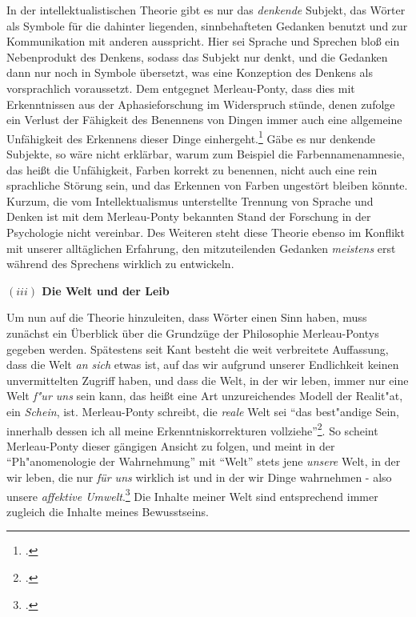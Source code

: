 \documentclass[a4paper, 12pt]{article}
\begin{document}
\begin{onehalfspace}
In der intellektualistischen Theorie gibt es nur das \emph{denkende} Subjekt, das Wörter als Symbole für die dahinter liegenden, sinnbehafteten Gedanken benutzt und zur Kommunikation mit anderen ausspricht. Hier sei Sprache und Sprechen bloß ein Nebenprodukt des Denkens, sodass das Subjekt nur denkt, und die Gedanken dann nur noch in Symbole übersetzt, was eine Konzeption des Denkens als vorsprachlich voraussetzt. Dem entgegnet Merleau-Ponty, dass dies mit Erkenntnissen aus der Aphasieforschung im Widerspruch stünde, denen zufolge ein Verlust der Fähigkeit des Benennens von Dingen immer auch eine allgemeine Unfähigkeit des Erkennens dieser Dinge einhergeht.\footnote{\Cite[Vgl.][S. 208 f.]{merleau1966phanomenologie}.} Gäbe es nur denkende Subjekte, so wäre nicht erklärbar, warum zum Beispiel die Farbennamenamnesie, das heißt die Unfähigkeit, Farben korrekt zu benennen, nicht auch eine rein sprachliche Störung sein, und das Erkennen von Farben ungestört bleiben könnte. Kurzum, die vom Intellektualismus unterstellte Trennung von Sprache und Denken ist mit dem Merleau-Ponty bekannten Stand der Forschung in der Psychologie nicht vereinbar. Des Weiteren steht diese Theorie ebenso im Konflikt mit unserer alltäglichen Erfahrung, den mitzuteilenden Gedanken \emph{meistens} erst während des Sprechens wirklich zu entwickeln. 

\vspace{5mm}

\noindent\textbf{$(iii)$ Die Welt und der Leib}

\noindent Um nun auf die Theorie hinzuleiten, dass Wörter einen Sinn haben, muss zunächst ein Überblick über die Grundzüge der Philosophie Merleau-Pontys gegeben werden. Spätestens seit Kant besteht die weit verbreitete Auffassung, dass die Welt \emph{an sich} etwas ist, auf das wir aufgrund unserer Endlichkeit keinen unvermittelten Zugriff haben, und dass die Welt, in der wir leben, immer nur eine Welt \emph{f"ur uns} sein kann, das heißt eine Art unzureichendes Modell der Realit"at, ein \emph{Schein}, ist. Merleau-Ponty schreibt, die \emph{reale} Welt sei "`das best"andige Sein, innerhalb dessen ich all meine Erkenntniskorrekturen vollziehe"'\footnote{\Cite[Siehe][S. 379]{merleau1966phanomenologie}.}. So scheint Merleau-Ponty dieser gängigen Ansicht zu folgen, und meint in der "`Ph"anomenologie der Wahrnehmung"' mit "`Welt"' stets jene \emph{unsere} Welt, in der wir leben, die nur \emph{für uns} wirklich ist und in der wir Dinge wahrnehmen - also unsere \emph{affektive Umwelt}.\footnote{\Cite[Vgl.][S. 185]{merleau1966phanomenologie}.} Die Inhalte meiner Welt sind entsprechend immer zugleich die Inhalte meines Bewusstseins.


\end{onehalfspace}
\end{document}
